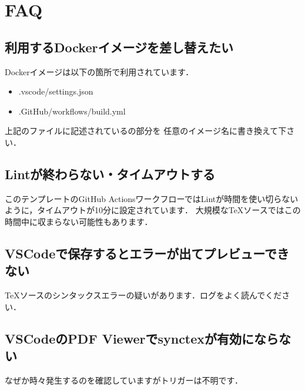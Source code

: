 \documentclass[main]{subfiles}
\begin{document}
\section{FAQ}

\subsection{利用するDockerイメージを差し替えたい}

Dockerイメージは以下の箇所で利用されています．

\begin{itemize}
    \item .vscode/settings.json
    \item .GitHub/workflows/build.yml
\end{itemize}

上記のファイルに記述されているの部分を
任意のイメージ名に書き換えて下さい．

\subsection{Lintが終わらない・タイムアウトする}

このテンプレートのGitHub ActionsワークフローではLintが時間を使い切らないように，タイムアウトが10分に設定されています．
大規模なTeXソースではこの時間中に収まらない可能性もあります．

\subsection{VSCodeで保存するとエラーが出てプレビューできない}

TeXソースのシンタックスエラーの疑いがあります．ログをよく読んでください．

\subsection{VSCodeのPDF Viewerでsynctexが有効にならない}

なぜか時々発生するのを確認していますがトリガーは不明です．
\end{document}
